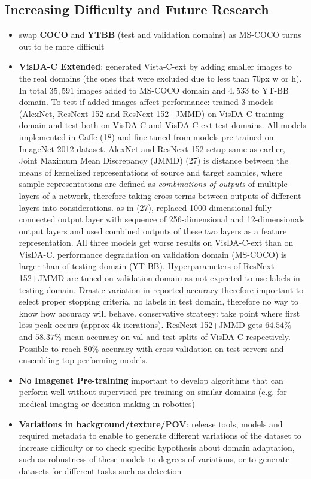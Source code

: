 \subsection{Increasing Difficulty and Future Research}
\begin{itemize}
	\item swap \textbf{COCO} and \textbf{YTBB} (test and validation domains) as MS-COCO turns out to be more difficult
	\item \textbf{VisDA-C Extended}: generated Vista-C-ext by adding smaller images to the real domains (the ones that were excluded due to less than 70px w or h). In total $35,591$ images added to MS-COCO domain and $4,533$ to YT-BB domain. To test if added images affect performance: trained 3 models (AlexNet, ResNext-152 and ResNext-152+JMMD) on VisDA-C training domain and test both on VisDA-C and VisDA-C-ext test domains. All models implemented in Caffe (18) and fine-tuned from models pre-trained on ImageNet 2012 dataset. AlexNet and ResNext-152 setup same as earlier, Joint Maximum Mean Discrepancy (JMMD) (27) is distance between the means of kernelized representations of source and target samples, where sample representations are defined as \textit{combinations of outputs} of multiple layers of a network, therefore taking cross-terms between outputs of different layers into considerations. as in (27), replaced 1000-dimensional fully connected output layer with sequence of 256-dimensional and 12-dimensionals output layers and used combined outputs of these two layers as a feature representation. All three models get worse results on VisDA-C-ext than on VisDA-C. performance degradation on validation domain (MS-COCO) is larger than of testing domain (YT-BB). Hyperparameters of ResNext-152+JMMD are tuned on validation domain as not expected to use labels in testing domain. Drastic variation in reported accuracy therefore important to select proper stopping criteria. no labels in test domain, therefore no way to know how accuracy will behave. conservative strategy: take point where first loss peak occurs (approx 4k iterations). ResNext-152+JMMD gets $64.54\%$ and $58.37\%$ mean accuracy on val and test splits of VisDA-C respectively. Possible to reach $80\%$ accuracy with cross validation on test servers and ensembling top performing models.
	\item \textbf{No Imagenet Pre-training} important to develop algorithms that can perform well without supervised pre-training on similar domains (e.g. for medical imaging or decision making in robotics)
	\item \textbf{Variations in background/texture/POV}: release tools, models and required metadata to enable to generate different variations of the dataset to increase difficulty or to check specific hypothesis about domain adaptation, such as robustness of these models to degrees of variations, or to generate datasets for different tasks such as detection	
\end{itemize}

